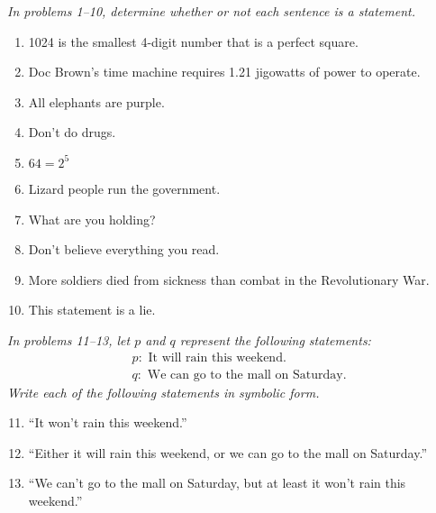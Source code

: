 \emph{In problems 1--10, determine whether or not each sentence is a statement.}
\begin{enumerate}
\item 1024 is the smallest 4-digit number that is a perfect square. 

\item Doc Brown's time machine requires 1.21 jigowatts of power to operate. 

\item All elephants are purple. 

\item Don't do drugs. 

\item $64=2^5$ 

\item Lizard people run the government. 

\item What are you holding? 

\item Don't believe everything you read. 

\item More soldiers died from sickness than combat in the Revolutionary War. 

\item This statement is a lie. 
\end{enumerate}

\emph{In problems 11--13, let $p$ and $q$ represent the following statements:}
\begin{align*}
&p: \textrm{ It will rain this weekend.}\\
&q: \textrm{ We can go to the mall on Saturday.}
\end{align*}
\emph{Write each of the following statements in symbolic form.}
\begin{enumerate}
\setcounter{enumi}{10}

\item ``It won't rain this weekend.'' 

\item ``Either it will rain this weekend, or we can go to the mall on Saturday.'' 

\item ``We can't go to the mall on Saturday, but at least it won't rain this weekend.'' 
\end{enumerate}

